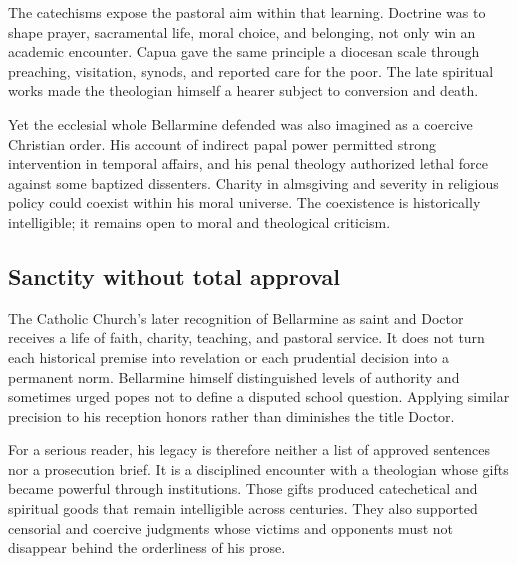The catechisms expose the pastoral aim within that learning.  Doctrine was to
shape prayer, sacramental life, moral choice, and belonging, not only win an
academic encounter.  Capua gave the same principle a diocesan scale through
preaching, visitation, synods, and reported care for the poor.  The late
spiritual works made the theologian himself a hearer subject to conversion and
death.

Yet the ecclesial whole Bellarmine defended was also imagined as a coercive
Christian order.  His account of indirect papal power permitted strong
intervention in temporal affairs, and his penal theology authorized lethal
force against some baptized dissenters.  Charity in almsgiving and severity in
religious policy could coexist within his moral universe.  The coexistence is
historically intelligible; it remains open to moral and theological criticism.

\subsection{Sanctity without total approval}

The Catholic Church's later recognition of Bellarmine as saint and Doctor
receives a life of faith, charity, teaching, and pastoral service.  It does not
turn each historical premise into revelation or each prudential decision into
a permanent norm.  Bellarmine himself distinguished levels of authority and
sometimes urged popes not to define a disputed school question.  Applying
similar precision to his reception honors rather than diminishes the title
Doctor.

For a serious reader, his legacy is therefore neither a list of approved
sentences nor a prosecution brief.  It is a disciplined encounter with a
theologian whose gifts became powerful through institutions.  Those gifts
produced catechetical and spiritual goods that remain intelligible across
centuries.  They also supported censorial and coercive judgments whose victims
and opponents must not disappear behind the orderliness of his prose.
